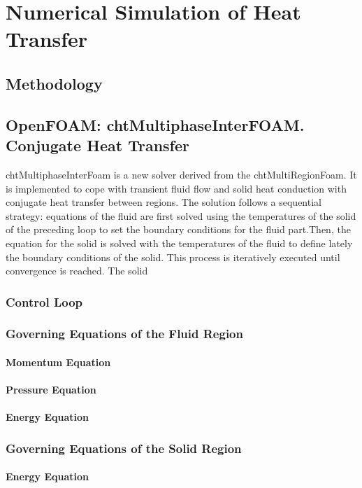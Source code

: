 \chapter{Numerical Simulation of Heat Transfer} %

\label{Chapter4}

\section{Methodology}
\section{OpenFOAM: chtMultiphaseInterFOAM. Conjugate Heat Transfer}
chtMultiphaseInterFoam is a new solver derived from the chtMultiRegionFoam. It is implemented to cope with transient fluid flow and solid heat conduction with conjugate heat transfer between regions.
The solution follows a sequential strategy: equations of the fluid are first solved using the temperatures of the solid of the preceding loop to set the boundary conditions for the fluid part.Then, the equation for the solid is solved with the temperatures of the fluid to define lately the boundary conditions of the solid. This process is iteratively executed until convergence is reached.
The solid 
\subsection{Control Loop}
\subsection{Governing Equations of the Fluid Region}
\subsubsection{Momentum Equation}
\subsubsection{Pressure Equation}
\subsubsection{Energy Equation}
\subsection{Governing Equations of the Solid Region}
\subsubsection{Energy Equation}

